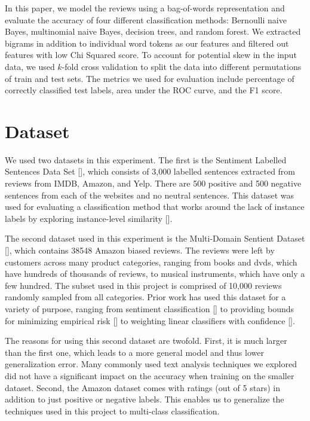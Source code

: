 \documentclass{article} %
\begin{document}
In this paper, we model the reviews using a bag-of-words representation and evaluate the accuracy of four different classification methods: Bernoulli naive Bayes, multinomial naive Bayes, decision trees, and random forest. We extracted bigrams in addition to individual word tokens as our features and filtered out features with low Chi Squared score. To account for potential skew in the input data, we used $k$-fold cross validation to split the data into different permutations of train and test sets. The metrics we used for evaluation include percentage of correctly classified test labels, area under the ROC curve, and the F1 score.

\section{Dataset}

We used two datasets in this experiment. The first is the Sentiment Labelled Sentences Data Set [], which consists of 3,000 labelled sentences extracted from reviews from IMDB, Amazon, and Yelp. There are 500 positive and 500 negative sentences from each of the websites and no neutral sentences. This dataset was used for evaluating a classification method that works around the lack of instance labels by exploring instance-level similarity [].

The second dataset used in this experiment is the Multi-Domain Sentient Dataset [], which contains 38548 Amazon biased reviews. The reviews were left by customers across many product categories, ranging from books and dvds, which have hundreds of thousands of reviews, to musical instruments, which have only a few hundred. The subset used in this project is comprised of 10,000 reviews randomly sampled from all categories. Prior work has used this dataset for a variety of purpose, ranging from sentiment classification [] to providing bounds for minimizing empirical risk [] to weighting linear classifiers with confidence [].

The reasons for using this second dataset are twofold. First, it is much larger than the first one, which leads to a more general model and thus lower generalization error. Many commonly used text analysis techniques we explored did not have a significant impact on the accuracy when training on the smaller dataset. Second, the Amazon dataset comes with ratings (out of 5 stars) in addition to just positive or negative labels. This enables us to generalize the techniques used in this project to multi-class classification.
\end{document}
